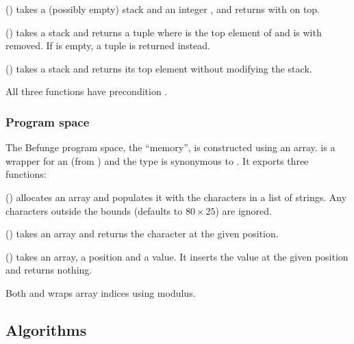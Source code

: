 \documentclass[12pt, a4paper]{article}
\begin{document}
\vspace{6pt}
\noindent
{} () takes a (possibly empty) stack  and an integer , and returns  with  on top.

\vspace{6pt}
\noindent
{} () takes a stack  and returns a tuple  where  is the top element of  and  is  with  removed. If  is empty, a tuple  is returned instead.

\vspace{6pt}
\noindent
{} () takes a stack and returns its top element without modifying the stack.

\vspace{6pt}
\noindent
All three functions have precondition .

\subsubsection{Program space}
\label{sec:structmem}

The Befunge program space, the “memory”, is constructed using an array.  is a wrapper for an  (from ) and the type  is synonymous to . It exports three functions:

\vspace{6pt}
\noindent
{} () allocates an array and populates it with the characters in a list of strings. Any characters outside the bounds (defaults to $80 \times 25$) are ignored.

\vspace{6pt}
\noindent
{} () takes an array and returns the character at the given position.

\vspace{6pt}
\noindent
{} () takes an array, a position and a value. It inserts the value at the given position and returns nothing.

\vspace{6pt}
\noindent
Both  and  wraps array indices using modulus.

\subsection{Algorithms}
\label{sec:algorithms}
\end{document}
